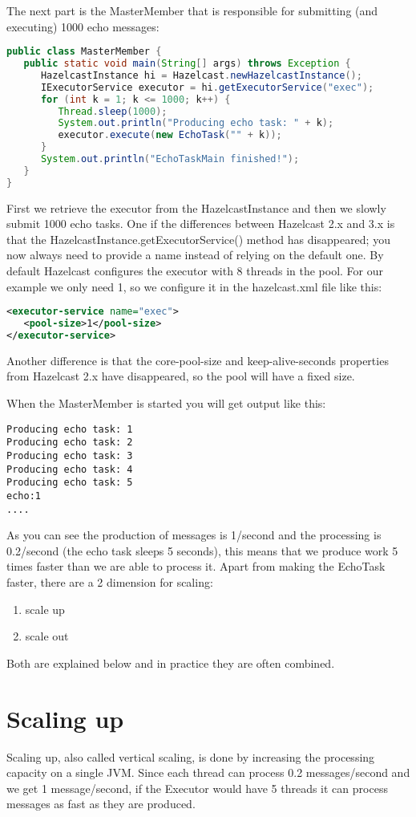 The next part is the MasterMember that is responsible for submitting (and executing) 1000 echo messages:
\begin{lstlisting}[language=java]
public class MasterMember {
   public static void main(String[] args) throws Exception {
      HazelcastInstance hi = Hazelcast.newHazelcastInstance();
      IExecutorService executor = hi.getExecutorService("exec");
      for (int k = 1; k <= 1000; k++) {
         Thread.sleep(1000);
         System.out.println("Producing echo task: " + k);
         executor.execute(new EchoTask("" + k));
      }
      System.out.println("EchoTaskMain finished!");
   }
}
\end{lstlisting}
First we retrieve the executor from the HazelcastInstance and then we slowly submit 1000 echo tasks. One if the differences between Hazelcast 2.x and 3.x is that the HazelcastInstance.getExecutorService() method has disappeared; you now always need to provide a name instead of relying on the default one. By default Hazelcast configures the executor with 8 threads in the pool. For our example we only need 1, so we configure it in the hazelcast.xml file like this:
\begin{lstlisting}[language=xml]
<executor-service name="exec">
   <pool-size>1</pool-size>
</executor-service>
\end{lstlisting}
Another difference is that the core-pool-size and keep-alive-seconds properties from Hazelcast 2.x have disappeared, so the pool will have a fixed size.

When the MasterMember is started you will get output like this:
\begin{lstlisting}
Producing echo task: 1
Producing echo task: 2
Producing echo task: 3
Producing echo task: 4
Producing echo task: 5
echo:1
....
\end{lstlisting}
As you can see the production of messages is 1/second and the processing is 0.2/second (the echo task sleeps 5 seconds), this means that we produce work 5 times faster than we are able to process it. Apart from making the EchoTask faster, there are a 2 dimension for scaling:
\begin{enumerate}
\item scale up 
\item scale out
\end{enumerate}
Both are explained below and in practice they are often combined. 

\section{Scaling up}
Scaling up, also called vertical scaling, is done by increasing the processing capacity on a single JVM. Since each thread can process 0.2 messages/second and we get 1 message/second, if the Executor would have 5 threads it can process messages as fast as they are produced.

